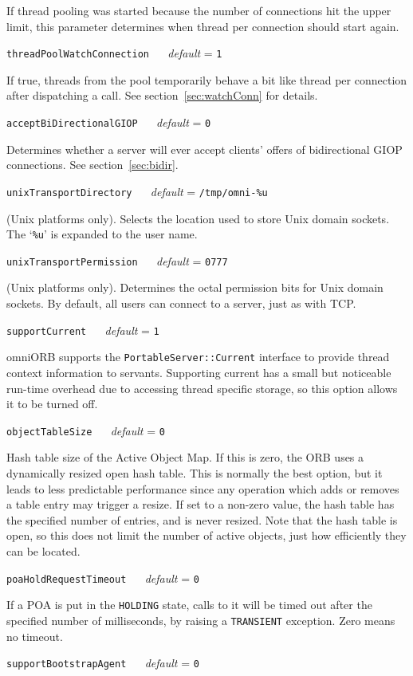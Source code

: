 \documentclass[draft,11pt,twoside,a4paper]{book}
\makeatletter
\newcommand{\type}[1]{\texttt{#1}}
\newcommand{\code}[1]{\texttt{#1}}
\newcommand{\confopt}[2]
  {\vspace{\baselineskip}\par\noindent\code{#1} ~~ \textit{default} =
   \code{#2}\\[-1ex]\@afterheading}
\makeatother
\begin{document}
If thread pooling was started because the number of connections hit
the upper limit, this parameter determines when thread per connection
should start again.


\confopt{threadPoolWatchConnection}{1}

If true, threads from the pool temporarily behave a bit like thread
per connection after dispatching a call. See
section~\ref{sec:watchConn} for details.


\confopt{acceptBiDirectionalGIOP}{0}

Determines whether a server will ever accept clients' offers of
bidirectional GIOP connections. See section~\ref{sec:bidir}.


\confopt{unixTransportDirectory}{/tmp/omni-\%u}

(Unix platforms only). Selects the location used to store Unix domain
sockets. The `\code{\%u}' is expanded to the user name.


\confopt{unixTransportPermission}{0777}

(Unix platforms only). Determines the octal permission bits for Unix
domain sockets. By default, all users can connect to a server, just as
with TCP.


\confopt{supportCurrent}{1}

omniORB supports the \type{PortableServer::Current} interface to
provide thread context information to servants. Supporting current has
a small but noticeable run-time overhead due to accessing thread
specific storage, so this option allows it to be turned off.


\confopt{objectTableSize}{0}

Hash table size of the Active Object Map. If this is zero, the ORB
uses a dynamically resized open hash table. This is normally the best
option, but it leads to less predictable performance since any
operation which adds or removes a table entry may trigger a resize. If
set to a non-zero value, the hash table has the specified number of
entries, and is never resized. Note that the hash table is open, so
this does not limit the number of active objects, just how efficiently
they can be located.


\confopt{poaHoldRequestTimeout}{0}

If a POA is put in the \code{HOLDING} state, calls to it will be timed
out after the specified number of milliseconds, by raising a
\code{TRANSIENT} exception. Zero means no timeout.


\confopt{supportBootstrapAgent}{0}
\end{document}
